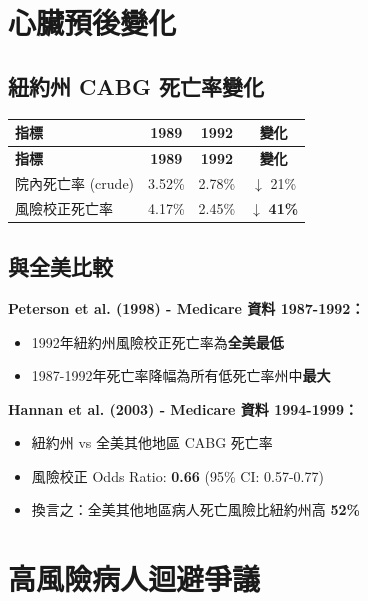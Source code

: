 \documentclass[12pt,a4paper]{article}
\begin{document}
\section{心臟預後變化}

\subsection{紐約州 CABG 死亡率變化}

\begin{longtable}{p{4cm}ccc}
\toprule
\textbf{指標} & \textbf{1989} & \textbf{1992} & \textbf{變化} \\
\midrule
\endfirsthead

\toprule
\textbf{指標} & \textbf{1989} & \textbf{1992} & \textbf{變化} \\
\midrule
\endhead

\bottomrule
\endfoot

院內死亡率 (crude) & 3.52\% & 2.78\% & $\downarrow$ 21\% \\
風險校正死亡率 & 4.17\% & 2.45\% & $\downarrow$ \textbf{41\%} \\
\bottomrule
\end{longtable}

\subsection{與全美比較}

\textbf{Peterson et al. (1998) - Medicare 資料 1987-1992：}
\begin{itemize}
    \item 1992年紐約州風險校正死亡率為\textbf{全美最低}
    \item 1987-1992年死亡率降幅為所有低死亡率州中\textbf{最大}
\end{itemize}

\textbf{Hannan et al. (2003) - Medicare 資料 1994-1999：}
\begin{itemize}
    \item 紐約州 vs 全美其他地區 CABG 死亡率
    \item 風險校正 Odds Ratio: \textbf{0.66} (95\% CI: 0.57-0.77)
    \item 換言之：全美其他地區病人死亡風險比紐約州高 \textbf{52\%}
\end{itemize}

\section{高風險病人迴避爭議}
\end{document}
